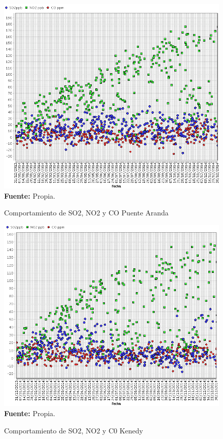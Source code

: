 \documentclass[a4paper,openright,12pt]{book}
\theoremstyle{definition}
\theoremstyle{remark}
\begin{document}
\begin{figure}[h]
\centering
\caption{Comportamiento de SO2, NO2 y CO Puente Aranda} 
\includegraphics[scale=0.47]{Componentes/Puente_Aranda_Componentes}
\label{fig:Tabla1}
\\ \textbf{Fuente: }Propia.
\end{figure}
\begin{figure}[h]
\centering
\caption{Comportamiento de SO2, NO2 y C0 Kenedy} 
\includegraphics[scale=0.47]{Componentes/Kenedy_Componentes}
\label{fig:Tabla1}
\\ \textbf{Fuente: }Propia.
\end{figure}
\end{document}

